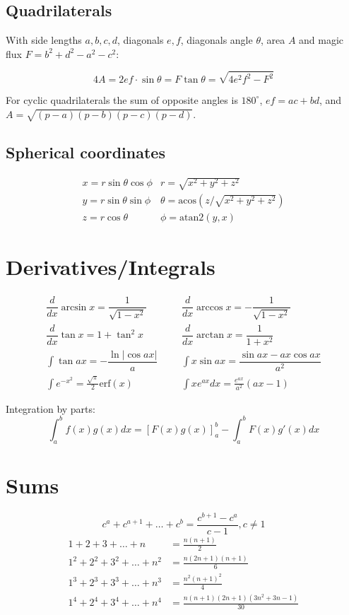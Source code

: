\documentclass[a4paper]{article}
\begin{document}
\begin{landscape}
\begin{multicols}{2}
\subsection{Quadrilaterals}
With side lengths $a,b,c,d$, diagonals $e, f$, diagonals angle $\theta$, area $A$ and
magic flux $F=b^2+d^2-a^2-c^2$:

\[ 4A = 2ef \cdot \sin\theta = F\tan\theta = \sqrt{4e^2f^2-F^2} \]

 For cyclic quadrilaterals the sum of opposite angles is $180^\circ$,
$ef = ac + bd$, and $A = \sqrt{(p-a)(p-b)(p-c)(p-d)}$.

\subsection{Spherical coordinates}
\[\begin{array}{cc}
x = r\sin\theta\cos\phi & r = \sqrt{x^2+y^2+z^2}\\
y = r\sin\theta\sin\phi & \theta = \textrm{acos}(z/\sqrt{x^2+y^2+z^2})\\
z = r\cos\theta & \phi = \textrm{atan2}(y,x)
\end{array}\]

\section{Derivatives/Integrals}
\begin{align*}
	\dfrac{d}{dx}\arcsin x = \dfrac{1}{\sqrt{1-x^2}} &&& \dfrac{d}{dx}\arccos x = -\dfrac{1}{\sqrt{1-x^2}} \\
	\dfrac{d}{dx}\tan x = 1+\tan^2 x &&& \dfrac{d}{dx}\arctan x = \dfrac{1}{1+x^2} \\
	\int\tan ax = -\dfrac{\ln|\cos ax|}{a} &&& \int x\sin ax = \dfrac{\sin ax-ax \cos ax}{a^2} \\
	\int e^{-x^2} = \frac{\sqrt \pi}{2} \text{erf}(x) &&& \int xe^{ax}dx = \frac{e^{ax}}{a^2}(ax-1)
\end{align*}

Integration by parts:
\[\int_a^bf(x)g(x)dx = [F(x)g(x)]_a^b-\int_a^bF(x)g'(x)dx\]

\section{Sums}
\[ c^a + c^{a+1} + \dots + c^{b} = \frac{c^{b+1} - c^a}{c-1}, c \neq 1 \]
\begin{align*}
	1 + 2 + 3 + \dots + n &= \frac{n(n+1)}{2} \\
	1^2 + 2^2 + 3^2 + \dots + n^2 &= \frac{n(2n+1)(n+1)}{6} \\
	1^3 + 2^3 + 3^3 + \dots + n^3 &= \frac{n^2(n+1)^2}{4} \\
	1^4 + 2^4 + 3^4 + \dots + n^4 &= \frac{n(n+1)(2n+1)(3n^2 + 3n - 1)}{30} \\
\end{align*}


\end{multicols}
\end{landscape}
\end{document}
